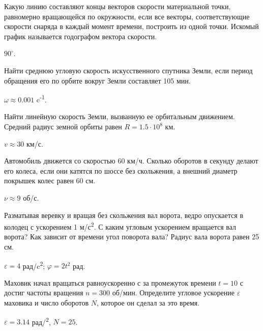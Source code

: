 \begin{ex}
Какую линию составляют концы векторов скорости материальной точки, равномерно вращающейся по окружности, если все векторы, соответствующие скорости снаряда в каждый момент времени, построить из одной точки. Искомый график называется годографом вектора скорости.
\begin{ans}
$90^{\circ}$.
\end{ans}
\end{ex}


\simpleProblems

\begin{ex} %
Найти среднюю угловую скорость искусственного спутника Земли, если период обращения его по орбите вокруг Земли составляет 105 мин.
\begin{ans}
$\omega \approx 0.001$ c\textsuperscript{-1}.
\end{ans}
\end{ex}

\begin{ex} %
Найти линейную скорость Земли, вызванную ее орбитальным движением. Средний радиус земной орбиты равен $R = 1.5 \cdot 10^8$ км.
\begin{ans}
$v \approx 30$ км/с.
\end{ans}
\end{ex}

\begin{ex} %
Автомобиль движется со скоростью 60 км/ч. Сколько оборотов в секунду делают его колеса, если они катятся по шоссе без скольжения, а внешний диаметр покрышек колес равен 60 см.
\begin{ans}
$\nu \approx 9$ об/с.
\end{ans}
\end{ex}

\begin{ex} %
Разматывая веревку и вращая без скольжения вал ворота, ведро опускается в колодец с ускорением 1 м/с\textsuperscript{2}. С каким угловым ускорением вращается вал ворота? Как зависит от времени угол поворота вала? Радиус вала ворота равен 25 см.
\begin{ans}
$\varepsilon = 4$ рад/c\textsuperscript{2}; $\varphi = 2t^2$ рад.
\end{ans}
\end{ex}

\begin{ex} %
Маховик начал вращаться равноускоренно с за промежуток времени $t=10$ с достиг частоты вращения $n=300$ об/мин. Определите угловое ускорение $\varepsilon$ маховика и число оборотов $N$, которое он сделал за это время.
\begin{ans}
$\varepsilon =  3.14$ рад/\textsuperscript{2}, $N = 25$.
\end{ans}
\end{ex}

